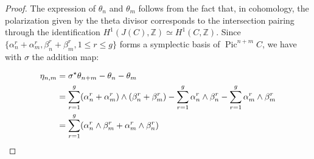 \documentclass{article}
\theoremstyle{definition}
\DeclareMathOperator{\pic}{\text{Pic}}
\newcommand{\eq}[2][1]{
\begin{equation*}
	\addtolength{\fboxsep}{0pt}
	\begin{alignedat}{#1}
	#2
	\end{alignedat}
\end{equation*}
}
\renewcommand{\leq}{\leqslant}
\begin{document}
    
\begin{proof}
The expression of $\theta_n$ and $\theta_m$ follows from the fact that, in cohomology, the polarization given by the theta divisor corresponds to the intersection pairing through the identification $H^1(J(C),\mathbb{Z})\simeq H^1(C,\mathbb{Z})$. Since $\lbrace \alpha_n^r+\alpha_m^r, \beta_n^r+\beta_m^r, 1\leq r\leq g \rbrace$ forms a symplectic basis of $\pic^{n+m}C$, we have with $\sigma$ the addition map:
    
\eq{
\eta_{n,m}&=\sigma^\star \theta_{n+m}-\theta_n-\theta_m\\
    &=\sum_{r=1}^g(\alpha_n^r+\alpha_m^r)\wedge(\beta_n^r+\beta_m^r)-\sum_{r=1}^g \alpha_n^r \wedge \beta_n^r  - \sum_{r=1}^g \alpha_m^r\wedge \beta_m^r\\
    &=\sum_{r=1}^g (\alpha_n^r \wedge\beta_m^r +\alpha_m^r \wedge\beta_n^r) }
    
    \end{proof}



\mainqhff*
\end{document}
